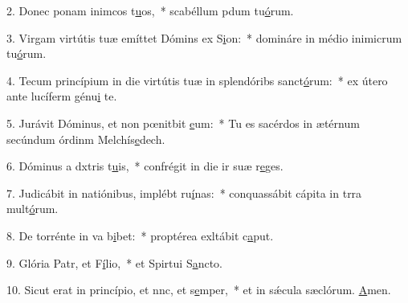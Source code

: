 2. Donec ponam inimcos t\uline{u}os,~* scabéllum pdum tu\uline{ó}rum.\par 
3. Virgam virtútis tuæ emíttet Dómins ex S\uline{i}on:~* domináre in médio inimicrum tu\uline{ó}rum.\par 
4. Tecum princípium in die virtútis tuæ in splendóribs sanct\uline{ó}rum:~* ex útero ante lucíferm génu\uline{i} te.\par 
5. Jurávit Dóminus, et non pœnitbit \uline{e}um:~* Tu es sacérdos in ætérnum secúndum órdinm Melchís\uline{e}dech.\par 
6. Dóminus a dxtris t\uline{u}is,~* confrégit in die ir suæ r\uline{e}ges.\par 
7. Judicábit in natiónibus, implébt ru\uline{í}nas:~* conquassábit cápita in trra mult\uline{ó}rum.\par 
8. De torrénte in va b\uline{i}bet:~* proptérea exltábit c\uline{a}put.\par 
9. Glória Patr, et F\uline{í}lio,~* et Spirtui S\uline{a}ncto.\par 
10. Sicut erat in princípio, et nnc, et s\uline{e}mper,~* et in sǽcula sæclórum. \uline{A}men.\par 
